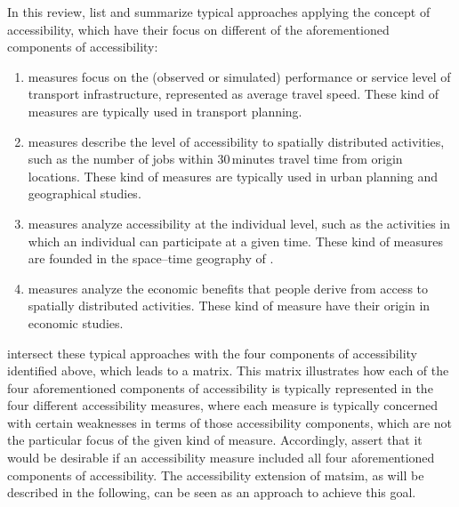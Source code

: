 In this review, \citet{Geurs2004AccessibilityReview} list and summarize typical approaches applying the concept 
of accessibility, which have their focus on different of the aforementioned components of accessibility:

\begin{enumerate}\styleEnumerate
	\item {} measures focus on the (observed or simulated) performance or service level 
	of transport infrastructure, \eg represented as average travel speed. These kind of measures are typically used 
	in transport planning.
	
	\item {} measures describe the level of accessibility to spatially distributed activities, such as 
	the number of jobs within 30\,minutes travel time from origin locations. These kind of measures are typically used 
	in urban planning and geographical studies.
	
	
	\item {} measures analyze accessibility at the individual level, such as the activities in which an 
	individual can participate at a given time. These kind of measures are founded in the space–time geography 
	of \citet{Haegerstrand1970}.
	
	\item {} measures analyze the economic benefits that people derive from access to spatially 
	distributed activities. These kind of measure have their origin in economic studies.
\end{enumerate}

\citet{Geurs2004AccessibilityReview} intersect these typical approaches with the four components of accessibility identified 
above, which leads to a matrix. This matrix illustrates how each of the four aforementioned components of accessibility is 
typically represented in the four different accessibility measures, where each measure is typically concerned with certain weaknesses 
in terms of those accessibility components, which are not the particular focus of the given kind of measure. Accordingly, \citet{Geurs2004AccessibilityReview} assert that it would be desirable if an accessibility measure included 
all four aforementioned components of accessibility. The accessibility extension of \gls{matsim}, as will be described in 
the following, can be seen as an approach to achieve this goal.

